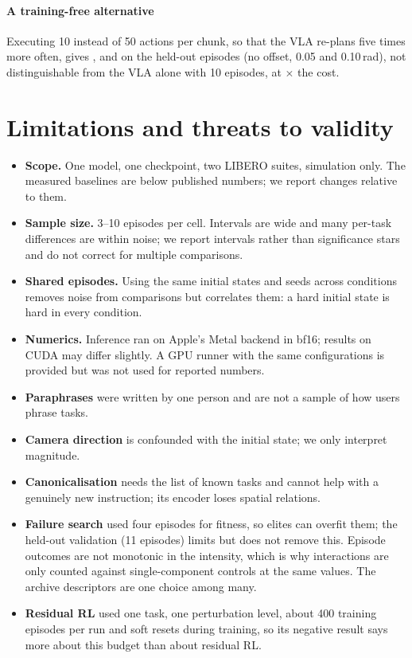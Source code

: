 \documentclass[10pt,twocolumn,letterpaper]{article}
\begin{document}
\paragraph{A training-free alternative} Executing 10 instead of 50 actions per chunk, so that the VLA
re-plans five times more often, gives \RLReplanClean{}, \RLReplanTrain{} and \RLReplanStrong{} on the
held-out episodes (no offset, 0.05 and 0.10\,rad), not distinguishable from the VLA alone with 10 episodes, at
\RLReplanSlowdown{}$\times$ the cost.

\section{Limitations and threats to validity}
\begin{itemize}
  \item \textbf{Scope.} One model, one checkpoint, two LIBERO suites, simulation only. The measured
  baselines are below published numbers; we report changes relative to them.
  \item \textbf{Sample size.} 3--10 episodes per cell. Intervals are wide and many per-task differences are
  within noise; we report intervals rather than significance stars and do not correct for multiple
  comparisons.
  \item \textbf{Shared episodes.} Using the same initial states and seeds across conditions removes noise
  from comparisons but correlates them: a hard initial state is hard in every condition.
  \item \textbf{Numerics.} Inference ran on Apple's Metal backend in bf16; results on CUDA may differ slightly.
  A GPU runner with the same configurations is provided but was not used for reported numbers.
  \item \textbf{Paraphrases} were written by one person and are not a sample of how users phrase tasks.
  \item \textbf{Camera direction} is confounded with the initial state; we only interpret magnitude.
  \item \textbf{Canonicalisation} needs the list of known tasks and cannot help with a genuinely new
  instruction; its encoder loses spatial relations.
  \item \textbf{Failure search} used four episodes for fitness, so elites can overfit them; the held-out
  validation (11 episodes) limits but does not remove this. Episode outcomes are not monotonic in the
  intensity, which is why interactions are only counted against single-component controls at the same
  values. The archive descriptors are one choice among many.
  \item \textbf{Residual RL} used one task, one perturbation level, about 400 training episodes per run and
  soft resets during training, so its negative result says more about this budget than about residual RL.
\end{itemize}
\end{document}
